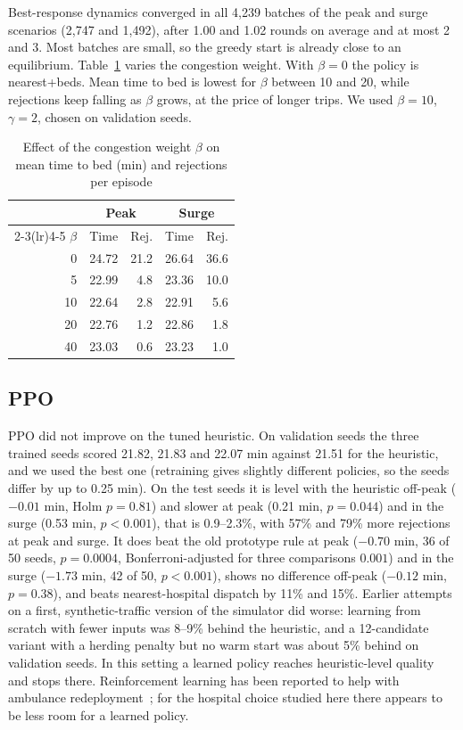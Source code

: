 \documentclass[conference]{IEEEtran}
\begin{document}
Best-response dynamics converged in all 4,239 batches of the peak and surge scenarios (2,747 and 1,492), after 1.00 and 1.02 rounds on average and at most 2 and 3. Most batches are small, so the greedy start is already close to an equilibrium. Table~\ref{tab:beta} varies the congestion weight. With $\beta=0$ the policy is nearest+beds. Mean time to bed is lowest for $\beta$ between 10 and 20, while rejections keep falling as $\beta$ grows, at the price of longer trips. We used $\beta=10$, $\gamma=2$, chosen on validation seeds.

\begin{table}[t]
\caption{Effect of the congestion weight $\beta$ on mean time to bed (min) and rejections per episode}
\label{tab:beta}
\centering\footnotesize
\begin{tabular}{rrrrr}
\toprule
 & \multicolumn{2}{c}{Peak} & \multicolumn{2}{c}{Surge} \\
\cmidrule(lr){2-3}\cmidrule(lr){4-5}
$\beta$ & Time & Rej. & Time & Rej. \\
\midrule
0 & 24.72 & 21.2 & 26.64 & 36.6 \\
5 & 22.99 & 4.8 & 23.36 & 10.0 \\
10 & 22.64 & 2.8 & 22.91 & 5.6 \\
20 & 22.76 & 1.2 & 22.86 & 1.8 \\
40 & 23.03 & 0.6 & 23.23 & 1.0 \\
\bottomrule
\end{tabular}
\end{table}

\subsection{PPO}
PPO did not improve on the tuned heuristic. On validation seeds the three trained seeds scored 21.82, 21.83 and 22.07 min against 21.51 for the heuristic, and we used the best one (retraining gives slightly different policies, so the seeds differ by up to 0.25 min). On the test seeds it is level with the heuristic off-peak ($-0.01$ min, Holm $p=0.81$) and slower at peak (0.21 min, $p=0.044$) and in the surge (0.53 min, $p<0.001$), that is 0.9--2.3\%, with 57\% and 79\% more rejections at peak and surge. It does beat the old prototype rule at peak ($-0.70$ min, 36 of 50 seeds, $p=0.0004$, Bonferroni-adjusted for three comparisons $0.001$) and in the surge ($-1.73$ min, 42 of 50, $p<0.001$), shows no difference off-peak ($-0.12$ min, $p=0.38$), and beats nearest-hospital dispatch by 11\% and 15\%. Earlier attempts on a first, synthetic-traffic version of the simulator did worse: learning from scratch with fewer inputs was 8--9\% behind the heuristic, and a 12-candidate variant with a herding penalty but no warm start was about 5\% behind on validation seeds. In this setting a learned policy reaches heuristic-level quality and stops there. Reinforcement learning has been reported to help with ambulance redeployment~\cite{tluli2024dynamic}; for the hospital choice studied here there appears to be less room for a learned policy.
\end{document}

